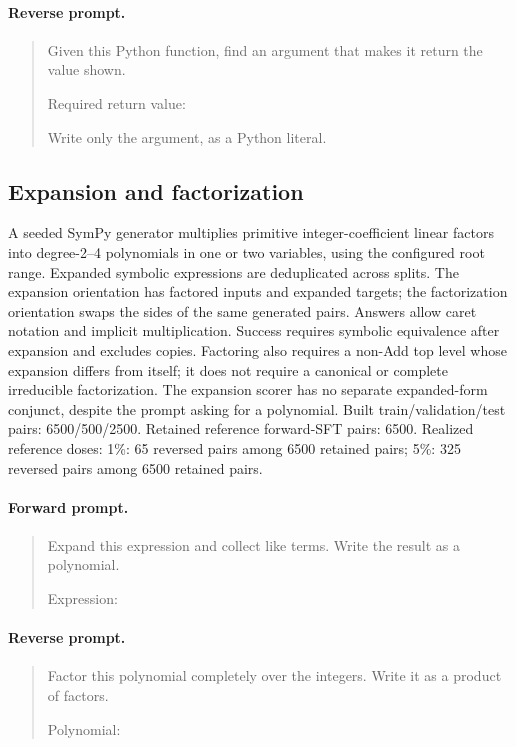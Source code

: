 \paragraph{Reverse prompt.}
\begin{quote}\small\ttfamily
Given this Python function, find an argument that makes it return the value shown.\par \par <FUNCTION CODE>\par \par Required return value:\par <INPUT B>\par \par Write only the argument, as a Python literal.
\end{quote}
\subsection{Expansion and factorization}
A seeded SymPy generator multiplies primitive integer-coefficient linear factors into degree-2--4 polynomials in one or two variables, using the configured root range. Expanded symbolic expressions are deduplicated across splits. The expansion orientation has factored inputs and expanded targets; the factorization orientation swaps the sides of the same generated pairs. Answers allow caret notation and implicit multiplication. Success requires symbolic equivalence after expansion and excludes copies. Factoring also requires a non-Add top level whose expansion differs from itself; it does not require a canonical or complete irreducible factorization. The expansion scorer has no separate expanded-form conjunct, despite the prompt asking for a polynomial.
Built train/validation/test pairs: 6500/500/2500. Retained reference forward-SFT pairs: 6500. 
Realized reference doses: 1\%: 65 reversed pairs among 6500 retained pairs; 5\%: 325 reversed pairs among 6500 retained pairs.
\paragraph{Forward prompt.}
\begin{quote}\small\ttfamily
Expand this expression and collect like terms. Write the result as a polynomial.\par \par Expression:\par <INPUT A>
\end{quote}
\paragraph{Reverse prompt.}
\begin{quote}\small\ttfamily
Factor this polynomial completely over the integers. Write it as a product of factors.\par \par Polynomial:\par <INPUT B>
\end{quote}
